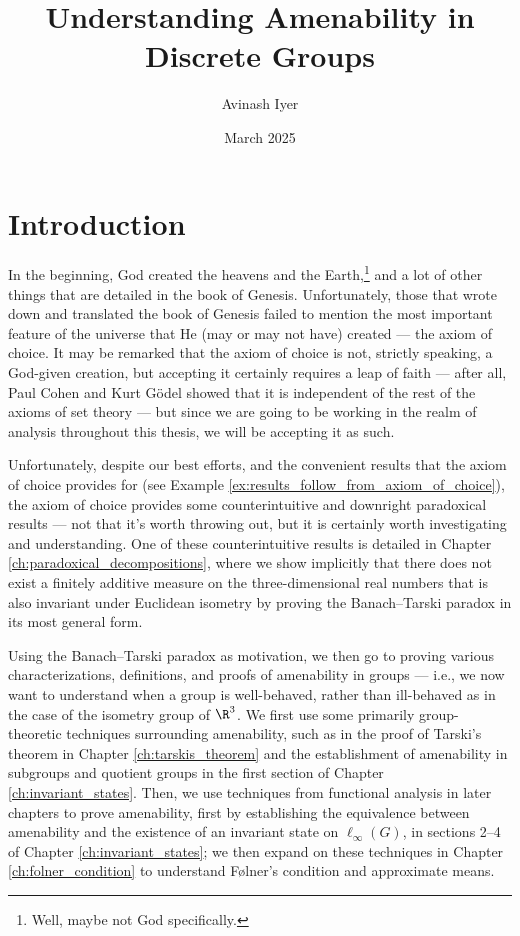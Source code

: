 \documentclass[10pt]{package2}
\title{Understanding Amenability in Discrete Groups}
\author{Avinash Iyer}
\date{March 2025}
\begin{document}
\maketitle
\RaggedRight
\tableofcontents
\chapter{Introduction}
In the beginning, God created the heavens and the Earth,\footnote{Well, maybe not God specifically.} and a lot of other things that are detailed in the book of Genesis. Unfortunately, those that wrote down and translated the book of Genesis failed to mention the most important feature of the universe that He (may or may not have) created --- the axiom of choice. It may be remarked that the axiom of choice is not, strictly speaking, a God-given creation, but accepting it certainly requires a leap of faith --- after all, Paul Cohen and Kurt Gödel showed that it is independent of the rest of the axioms of set theory --- but since we are going to be working in the realm of analysis throughout this thesis, we will be accepting it as such.\newline

Unfortunately, despite our best efforts, and the convenient results that the axiom of choice provides for (see Example \ref{ex:results_follow_from_axiom_of_choice}), the axiom of choice provides some counterintuitive and downright paradoxical results --- not that it's worth throwing out, but it is certainly worth investigating and understanding. One of these counterintuitive results is detailed in Chapter \ref{ch:paradoxical_decompositions}, where we show implicitly that there does not exist a finitely additive measure on the three-dimensional real numbers that is also invariant under Euclidean isometry by proving the Banach--Tarski paradox in its most general form.\newline

Using the Banach--Tarski paradox as motivation, we then go to proving various characterizations, definitions, and proofs of amenability in groups --- i.e., we now want to understand when a group is well-behaved, rather than ill-behaved as in the case of the isometry group of $\R^3$. We first use some primarily group-theoretic techniques surrounding amenability, such as in the proof of Tarski's theorem in Chapter \ref{ch:tarskis_theorem} and the establishment of amenability in subgroups and quotient groups in the first section of Chapter \ref{ch:invariant_states}. Then, we use techniques from functional analysis in later chapters to prove amenability, first by establishing the equivalence between amenability and the existence of an invariant state on $\ell_{\infty}(G)$, in sections 2--4 of Chapter \ref{ch:invariant_states}; we then expand on these techniques in Chapter \ref{ch:folner_condition} to understand Følner's condition and approximate means.\newline
\end{document}
